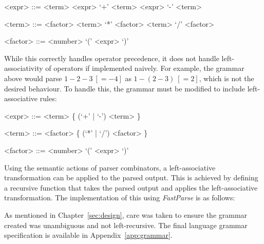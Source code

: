 \begin{center}
    \begin{grammar}
        <expr> ::= <term>
        \alt <expr> `+' <term>
        \alt <expr> `-' <term>

        <term> ::= <factor>
        \alt <term> `*' <factor>
        \alt <term> `/' <factor>

        <factor> ::= <number>
        \alt `(' <expr> `)'
    \end{grammar}
\end{center}

While this correctly handles operator precedence, it does not handle left-associativity of
operators if implemented naively. For example, the grammar above would parse
\(1 - 2 - 3 ~[= -4]\) as \(1 - (2 - 3) ~[=2]\),
which is not the desired behaviour. To handle this, the grammar must be modified to include
left-associative rules:

\begin{grammar}
    <expr> ::= <term> \{ (`+' | `-') <term> \}

    <term> ::= <factor> \{ (`*' | `/') <factor> \}

    <factor> ::= <number>
    \alt `(' <expr> `)'
\end{grammar}

Using the semantic actions of parser combinators, a left-associative transformation can be
applied to the parsed output. This is achieved by defining a recursive function that takes the
parsed output and applies the left-associative transformation. The implementation of this using
\emph{FastParse} is as follows:


As mentioned in Chapter~\ref{sec:design}, care was taken to ensure the grammar created was
unambiguous and not left-recursive. The final language grammar specification is available in
Appendix~\ref{app:grammar}.

